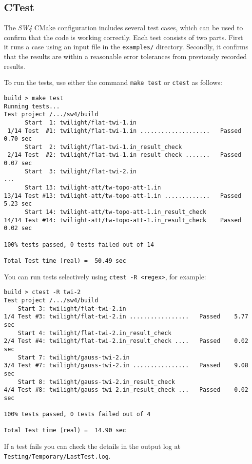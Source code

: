 \documentclass[11pt]{article}
\begin{document}
\subsection{CTest}
The \emph{SW4} CMake configuration includes several test cases, which can be used to confirm that
the code is working correctly.  Each test consists of two parts. First it runs a case using an input
file in the \verb+examples/+ directory. Secondly, it confirms that the results are within
a reasonable error tolerances from previously recorded results.

To run the tests, use either the command \texttt{make test} or \texttt{ctest} as follows:
%
\begin{verbatim}
build > make test
Running tests...
Test project /.../sw4/build
      Start  1: twilight/flat-twi-1.in
 1/14 Test  #1: twilight/flat-twi-1.in ....................   Passed    0.70 sec
      Start  2: twilight/flat-twi-1.in_result_check
 2/14 Test  #2: twilight/flat-twi-1.in_result_check .......   Passed    0.07 sec
      Start  3: twilight/flat-twi-2.in
...
      Start 13: twilight-att/tw-topo-att-1.in
13/14 Test #13: twilight-att/tw-topo-att-1.in .............   Passed    5.23 sec
      Start 14: twilight-att/tw-topo-att-1.in_result_check
14/14 Test #14: twilight-att/tw-topo-att-1.in_result_check    Passed    0.02 sec

100% tests passed, 0 tests failed out of 14

Total Test time (real) =  50.49 sec
\end{verbatim}

You can run tests selectively using \texttt{ctest -R \textless regex\textgreater}, for example:
%
\begin{verbatim}
build > ctest -R twi-2
Test project /.../sw4/build
    Start 3: twilight/flat-twi-2.in
1/4 Test #3: twilight/flat-twi-2.in .................   Passed    5.77 sec
    Start 4: twilight/flat-twi-2.in_result_check
2/4 Test #4: twilight/flat-twi-2.in_result_check ....   Passed    0.02 sec
    Start 7: twilight/gauss-twi-2.in
3/4 Test #7: twilight/gauss-twi-2.in ................   Passed    9.08 sec
    Start 8: twilight/gauss-twi-2.in_result_check
4/4 Test #8: twilight/gauss-twi-2.in_result_check ...   Passed    0.02 sec

100% tests passed, 0 tests failed out of 4

Total Test time (real) =  14.90 sec
\end{verbatim}

If a test fails you can check the details in the output log at
\texttt{Testing/Temporary/LastTest.log}.
\end{document}
